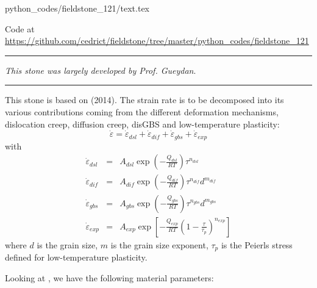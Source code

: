 \begin{flushright} {\tiny {\color{gray} python\_codes/fieldstone\_121/text.tex}} \end{flushright}

\begin{center}

Code at \url{https://github.com/cedrict/fieldstone/tree/master/python_codes/fieldstone_121}
\end{center}

\par\noindent\rule{\textwidth}{0.4pt}

{\sl This stone was largely developed by Prof. Gueydan}. 

\par\noindent\rule{\textwidth}{0.4pt}

This stone is based on \textcite{gupr14} (2014). 
The strain rate is to be decomposed into its various contributions 
coming from the different deformation mechanisms, dislocation creep,
diffusion creep, disGBS and low-temperature plasticity:
\[
\dot\varepsilon = \dot\varepsilon_{dsl} + \dot\varepsilon_{dif} + 
\dot\varepsilon_{gbs} + \dot\varepsilon_{exp} 
\]
with
\begin{eqnarray}
\dot\varepsilon_{dsl}&=&A_{dsl}\exp\left(-\frac{Q_{dsl}}{RT} \right) \tau^{n_{dsl}}  \\
\dot\varepsilon_{dif}&=&A_{dif}\exp\left(-\frac{Q_{dif}}{RT} \right) \tau^{n_{dif}} d^{m_{dif}} \\
\dot\varepsilon_{gbs}&=&A_{gbs}\exp\left(-\frac{Q_{gbs}}{RT} \right) \tau^{n_{gbs}} d^{m_{gbs}} \\
\dot\varepsilon_{exp}&=&A_{exp}\exp\left[-\frac{Q_{exp}}{RT} \left(1 -\frac{\tau}{\tau_p}\right)^{n_{exp}} \right]   
\end{eqnarray}
where $d$ is the grain size, $m$ is the grain size exponent, $\tau_p$ is the Peierls stress defined
for low-temperature plasticity.

Looking at \cite{gupr14}, we have the following material parameters:

